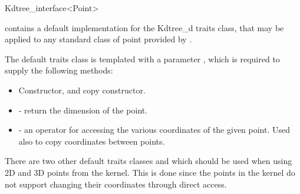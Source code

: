 \begin{ccRefClass}{Kdtree_interface<Point>}

{\cgal}  contains a default implementation for the Kdtree\_d traits
class, that
may be applied to any
standard class of point provided by \cgal.

The default traits class  is
templated with a parameter , which is required to
supply the following methods:

\begin{itemize}
    \item Constructor, and copy constructor.

    \item {} - return the dimension of the point.
    
    \item {} - an operator for accessing
    the various coordinates of the given point. Used also to copy
    coordinates between points.
\end{itemize}

There are two other default traits classes  
and  which should be used when using 
2D and 3D points from the {\cgal} kernel. This is done since the points in the
kernel do not support changing their coordinates through direct access. 

\end{ccRefClass}
